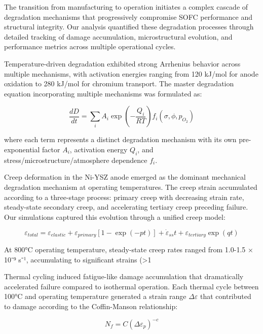 \documentclass[conference]{IEEEtran}
\begin{document}
The transition from manufacturing to operation initiates a complex cascade of degradation mechanisms that progressively compromise SOFC performance and structural integrity. Our analysis quantified these degradation processes through detailed tracking of damage accumulation, microstructural evolution, and performance metrics across multiple operational cycles.

Temperature-driven degradation exhibited strong Arrhenius behavior across multiple mechanisms, with activation energies ranging from 120 kJ/mol for anode oxidation to 280 kJ/mol for chromium transport. The master degradation equation incorporating multiple mechanisms was formulated as:

\begin{equation}
\frac{dD}{dt} = \sum_i A_i \exp\left(-\frac{Q_i}{RT}\right) f_i(\sigma, \phi, p_{O_2})
\end{equation}

where each term represents a distinct degradation mechanism with its own pre-exponential factor $A_i$, activation energy $Q_i$, and stress/microstructure/atmosphere dependence $f_i$.

Creep deformation in the Ni-YSZ anode emerged as the dominant mechanical degradation mechanism at operating temperatures. The creep strain accumulated according to a three-stage process: primary creep with decreasing strain rate, steady-state secondary creep, and accelerating tertiary creep preceding failure. Our simulations captured this evolution through a unified creep model:

\begin{equation}
\varepsilon_{total} = \varepsilon_{elastic} + \varepsilon_{primary}[1-\exp(-pt)] + \dot{\varepsilon}_{ss}t + \varepsilon_{tertiary}\exp(qt)
\end{equation}

At 800°C operating temperature, steady-state creep rates ranged from 1.0-1.5 × 10⁻⁹ s⁻¹, accumulating to significant strains (>1%

Thermal cycling induced fatigue-like damage accumulation that dramatically accelerated failure compared to isothermal operation. Each thermal cycle between 100°C and operating temperature generated a strain range $\Delta\varepsilon$ that contributed to damage according to the Coffin-Manson relationship:

\begin{equation}
N_f = C(\Delta\varepsilon_p)^{-c}
\end{equation}
\end{document}
